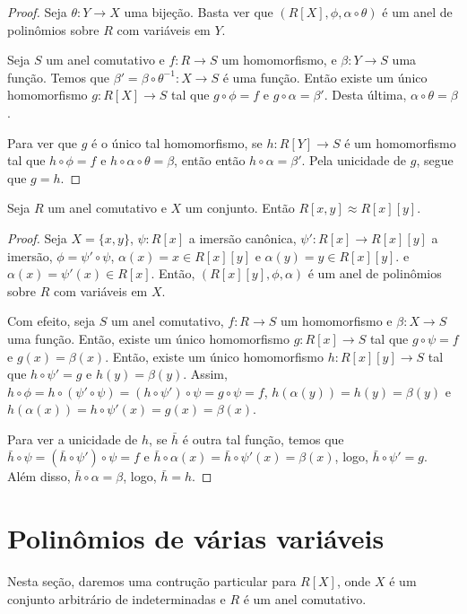 \begin{proof}
Seja $\theta:Y\rightarrow X$ uma bijeção. Basta ver que $(R[X], \phi, \alpha\circ \theta)$ é um anel de polinômios sobre $R$ com variáveis em $Y$.

Seja $S$ um anel comutativo e $f:R\rightarrow S$ um homomorfismo, e $\beta:Y\rightarrow S$ uma função.
Temos que $\beta'=\beta\circ \theta^{-1}:X\rightarrow S$ é uma função.
Então existe um único homomorfismo $g: R[X]\rightarrow S$ tal que $g\circ \phi=f$ e $g\circ \alpha=\beta'$.
Desta última, $\alpha\circ \theta=\beta$.

Para ver que $g$ é o único tal homomorfismo, se $h: R[Y]\rightarrow S$ é um homomorfismo tal que $h\circ \phi=f$ e $h\circ \alpha\circ \theta=\beta$, então então $h\circ \alpha=\beta'$.
Pela unicidade de $g$, segue que $g=h$.
\end{proof}
\begin{prop}
    Seja $R$ um anel comutativo e $X$ um conjunto. Então $R[x, y]\approx R[x][y]$.
\end{prop}
\begin{proof}
    Seja $X=\{x, y\}$, $\psi:R[x]$ a imersão canônica, $\psi': R[x]\rightarrow R[x][y]$ a imersão, $\phi=\psi'\circ \psi$, $\alpha(x)=x\in R[x][y]$ e $\alpha(y)=y\in R[x][y]$. e $\alpha(x)=\psi'(x)\in R[x]$.
    Então, $(R[x][y], \phi, \alpha)$ é um anel de polinômios sobre $R$ com variáveis em $X$.

    Com efeito, seja $S$ um anel comutativo, $f:R\rightarrow S$ um homomorfismo e $\beta:X\rightarrow S$ uma função.
    Então, existe um único homomorfismo $g:R[x]\rightarrow S$ tal que $g\circ \psi=f$ e $g(x)=\beta(x)$.
    Então, existe um único homomorfismo $h:R[x][y]\rightarrow S$ tal que $h\circ \psi'=g$ e $h(y)=\beta(y)$.
    Assim, $h\circ \phi=h\circ(\psi'\circ \psi)=(h\circ \psi')\circ \psi=g\circ \psi=f$, $h(\alpha(y))=h(y)=\beta(y)$ e $h(\alpha(x))=h\circ \psi'(x)=g(x)=\beta(x)$.

    Para ver a unicidade de $h$, se $\bar h$ é outra tal função, temos que $\bar h\circ \psi=(\bar h\circ \psi')\circ \psi=f$ e $\bar h\circ \alpha(x)=\bar h\circ \psi'(x)=\beta(x)$, logo, $\bar h\circ \psi'=g$.
    Além disso, $\bar h\circ \alpha=\beta$, logo, $\bar h=h$.
\end{proof}

\section{Polinômios de várias variáveis}
Nesta seção, daremos uma contrução particular para $R[X]$, onde $X$ é um conjunto arbitrário de indeterminadas e $R$ é um anel comutativo.

